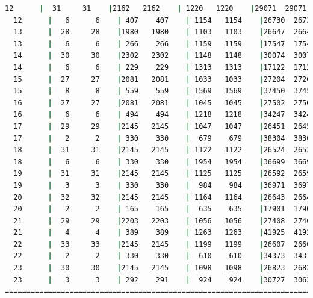 \begin{lstlisting}[language=bash,basicstyle=\ttfamily\scriptsize]
  12      |  31     31    |2162   2162    | 1220   1220    |29071  29071    | 45     70
  12      |   6      6    | 407    407    | 1154   1154    |26730  26730    | 52     69
  13      |  28     28    |1980   1980    | 1103   1103    |26647  26647    | 55     71
  13      |   6      6    | 266    266    | 1159   1159    |17547  17547    | 41     71
  14      |  30     30    |2302   2302    | 1148   1148    |30074  30074    | 44     66
  14      |   6      6    | 229    229    | 1313   1313    |17122  17122    | 40     66
  15      |  27     27    |2081   2081    | 1033   1033    |27204  27204    | 51     69
  15      |   8      8    | 559    559    | 1569   1569    |37450  37450    | 47     70
  16      |  27     27    |2081   2081    | 1045   1045    |27502  27502    | 43     70
  16      |   6      6    | 494    494    | 1218   1218    |34247  34247    | 43     68
  17      |  29     29    |2145   2145    | 1047   1047    |26451  26451    | 38     69
  17      |   2      2    | 330    330    |  679    679    |38304  38304    | 62     69
  18      |  31     31    |2145   2145    | 1122   1122    |26524  26524    | 49     64
  18      |   6      6    | 330    330    | 1954   1954    |36699  36699    | 39     65
  19      |  31     31    |2145   2145    | 1125   1125    |26592  26592    | 53     63
  19      |   3      3    | 330    330    |  984    984    |36971  36971    | 50     63
  20      |  32     32    |2145   2145    | 1164   1164    |26643  26643    | 46     63
  20      |   2      2    | 165    165    |  635    635    |17901  17901    | 38     63
  21      |  29     29    |2203   2203    | 1056   1056    |27408  27408    | 50     67
  21      |   4      4    | 389    389    | 1263   1263    |41925  41925    | 38     67
  22      |  33     33    |2145   2145    | 1199   1199    |26607  26607    | 45     68
  22      |   2      2    | 330    330    |  610    610    |34373  34373    | 46     68
  23      |  30     30    |2145   2145    | 1098   1098    |26823  26823    | 44     62
  23      |   3      3    | 292    291    |  924    924    |30727  30622    | 56     63
============================================================================================
\end{lstlisting}

